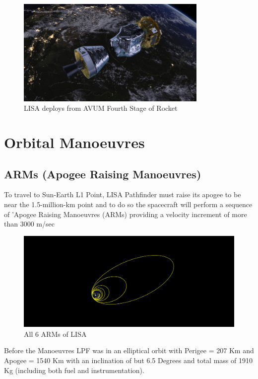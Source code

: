 \documentclass[11pt,fleqn]{book} %
\begin{document}
\begin{figure}[h]
    \centering
    \includegraphics[width=0.82\textwidth]{Separation.jpg}
    \caption{LISA deploys from AVUM Fourth Stage of Rocket}
    \label{fig:pca}
\end{figure}
\clearpage

\chapter{Orbital Manoeuvres}
\section{ARMs (Apogee Raising Manoeuvres)}
To travel to Sun-Earth L1 Point, LISA Pathfinder must raise its apogee to be near the 1.5-million-km point and to do so the spacecraft will perform a sequence of 'Apogee Raising Manoeuvres (ARMs) providing a velocity increment of more than 3000 m/sec  
\begin{figure}[h]
	\centering
    \includegraphics[width=1.0\textwidth]{APMs.png}
    \caption{All 6 ARMs of LISA}
\end{figure}

Before the Manoeuvres LPF was in an elliptical orbit with Perigee = 207 Km and Apogee = 1540 Km with an inclination of but 6.5 Degrees and total mass of 1910 Kg (including both fuel and instrumentation).
\clearpage
\end{document}
